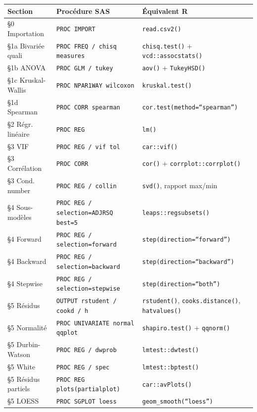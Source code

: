 \documentclass[11pt,a4paper]{memoirerecherche}
\begin{document}
\begin{tabular}{@{} l l l @{}}
\toprule
\textbf{Section} & \textbf{Procédure SAS} & \textbf{Équivalent R} \\
\midrule
\S{}0 Importation & \texttt{PROC IMPORT} & \texttt{read.csv2()} \\
\S{}1a Bivariée quali & \texttt{PROC FREQ / chisq measures} & \texttt{chisq.test()} + \texttt{vcd::assocstats()} \\
\S{}1b ANOVA & \texttt{PROC GLM / tukey} & \texttt{aov()} + \texttt{TukeyHSD()} \\
\S{}1c Kruskal-Wallis & \texttt{PROC NPAR1WAY wilcoxon} & \texttt{kruskal.test()} \\
\S{}1d Spearman & \texttt{PROC CORR spearman} & \texttt{cor.test(method=``spearman'')} \\
\S{}2 Régr. linéaire & \texttt{PROC REG} & \texttt{lm()} \\
\S{}3 VIF & \texttt{PROC REG / vif tol} & \texttt{car::vif()} \\
\S{}3 Corrélation & \texttt{PROC CORR} & \texttt{cor()} + \texttt{corrplot::corrplot()} \\
\S{}3 Cond. number & \texttt{PROC REG / collin} & \texttt{svd()}, rapport max/min \\
\S{}4 Sous-modèles & \texttt{PROC REG / selection=ADJRSQ best=5} & \texttt{leaps::regsubsets()} \\
\S{}4 Forward & \texttt{PROC REG / selection=forward} & \texttt{step(direction=``forward'')} \\
\S{}4 Backward & \texttt{PROC REG / selection=backward} & \texttt{step(direction=``backward'')} \\
\S{}4 Stepwise & \texttt{PROC REG / selection=stepwise} & \texttt{step(direction=``both'')} \\
\S{}5 Résidus & \texttt{OUTPUT rstudent / cookd / h} & \texttt{rstudent()}, \texttt{cooks.distance()}, \texttt{hatvalues()} \\
\S{}5 Normalité & \texttt{PROC UNIVARIATE normal qqplot} & \texttt{shapiro.test()} + \texttt{qqnorm()} \\
\S{}5 Durbin-Watson & \texttt{PROC REG / dwprob} & \texttt{lmtest::dwtest()} \\
\S{}5 White & \texttt{PROC REG / spec} & \texttt{lmtest::bptest()} \\
\S{}5 Résidus partiels & \texttt{PROC REG plots(partialplot)} & \texttt{car::avPlots()} \\
\S{}5 LOESS & \texttt{PROC SGPLOT loess} & \texttt{geom\_smooth(``loess'')} \\

\end{tabular}
\end{document}

